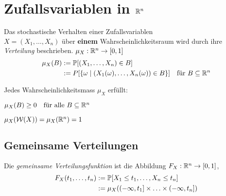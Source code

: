 


\section{Zufallsvariablen in \(\R^n\)}

\begin{definition}[Verteilung]
	Das stochastische Verhalten einer Zufallsvariablen \\ \(X=(X_1,\ldots,X_n)\)
	über \textbf{einem} Wahrscheinlichkeitsraum wird durch ihre \emph{Verteilung} beschrieben.
	\(\mu_X :\R^n \rightarrow[0,1]\)
	\begin{eqnarray*}
		\begin{split}
			\mu_X(B)	 &:= \P[(X_1,\ldots,X_n) \in B] \\
			&:=  P[\{\omega \mid (X_1(\omega),\ldots,X_n(\omega)) \in B\}]
			\quad \text{für } B \subseteq \R^n
		\end{split}
	\end{eqnarray*}
	\begin{note}

		Jedes Wahrscheinlichkeitsmass \(\mu_X\) erfüllt:
		\begin{compactenum}
			\item \(\mu_X(B) \geq 0 \quad \text{für alle } B \subseteq \R^n \)
			\item \(\mu_X(\mathcal{W}(X)) = \mu_X(\R^n) = 1\)
		\end{compactenum}
	\end{note}

\end{definition}


\subsection{Gemeinsame Verteilungen}


\begin{definition}
	Die \emph{gemeinsame Verteilungsfunktion} ist die Abbildung \(F_X:\R^n \rightarrow [0,1]\),
	\begin{eqnarray*}
		\begin{split}
			F_X(t_1,\ldots,t_n) &:= \P[X_1 \leq t_1,\ldots,X_n \leq t_n] \\
			&:= \mu_X(  (-\infty, t_1] \times \ldots \times (-\infty, t_n] )
		\end{split}
	\end{eqnarray*}
\end{definition}


